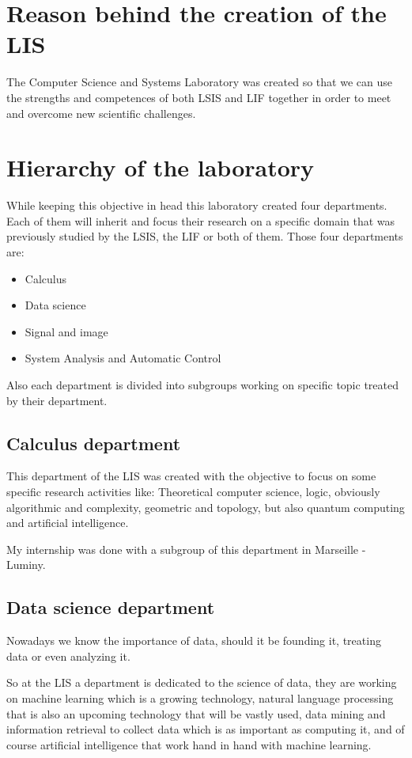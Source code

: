 \section{Reason behind the creation of the LIS}
The Computer Science and Systems Laboratory was created so that we can use the strengths and competences of both LSIS and LIF together in order to meet and overcome new scientific challenges.

\section{Hierarchy of the laboratory}
While keeping this objective in head this laboratory created four departments. Each of them will inherit and focus their research on a specific domain that was previously studied by the LSIS, the LIF or both of them.
Those four departments are:
\begin{itemize}[noitemsep, nolistsep]
	\item{Calculus}
	\item{Data science}
	\item{Signal and image}
	\item{System Analysis and Automatic Control}
\end{itemize}
Also each department is divided into subgroups working on specific topic treated by their department.

\subsection{Calculus department}
This department of the LIS was created with the objective to focus on some specific research activities like: Theoretical computer science, logic, obviously algorithmic and complexity, geometric and topology, but also quantum computing and artificial intelligence.

My internship was done with a subgroup of this department in Marseille - Luminy.
\subsection{Data science department}
Nowadays we know the importance of data, should it be founding it, treating data or even analyzing it. 

So at the LIS a department is dedicated to the science of data, they are working on  machine learning which is a growing technology, natural language processing that is also an upcoming technology that will be vastly used, data mining and information retrieval to collect data which is as important as computing it, and of course artificial intelligence that work hand in hand with machine learning.
